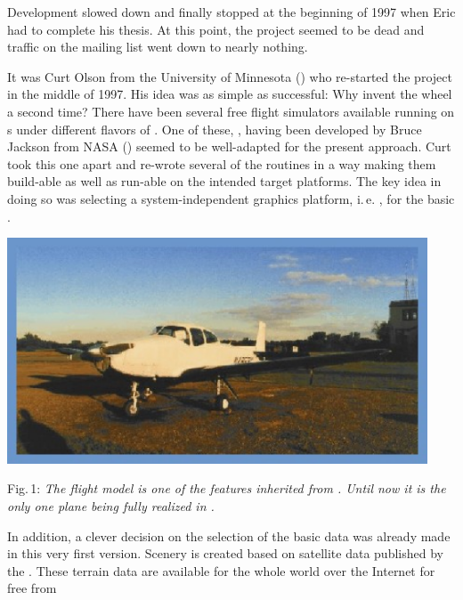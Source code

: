 Development slowed down and finally stopped at the beginning of 1997 when Eric had to
complete his thesis. At this point, the project seemed to be dead and traffic on the
mailing list went down to nearly nothing.

It was Curt Olson from the University of Minnesota
() who re-started the project in the middle of 1997. His idea
was as simple as successful: Why invent the wheel a second time? There have been several
free flight simulators available running on
s under different flavors of . One of these,
, having been developed by Bruce Jackson from NASA
() seemed to be well-adapted for the present approach. Curt
took this one apart and re-wrote several of the routines in a way making them build-able
as well as run-able on the intended target platforms. The key idea in doing so was
selecting a system-independent graphics platform, i.\,e. , for the basic
.
\medskip

 \centerline{
\includegraphics[clip,width=12.5cm]{navion.eps}
}

\smallskip
 \noindent
Fig.\,1: \textit{The  flight model is one of the features \FlightGear
inherited from . Until now it is the only one plane being fully realized
in \FlightGear\hspace{-1mm}.}
\medskip

In addition, a clever decision on the selection of the basic  data was
already made in this very first version. \FlightGear Scenery is created based on
satellite data published by the . These terrain data are
available for the whole world over the Internet for free from


